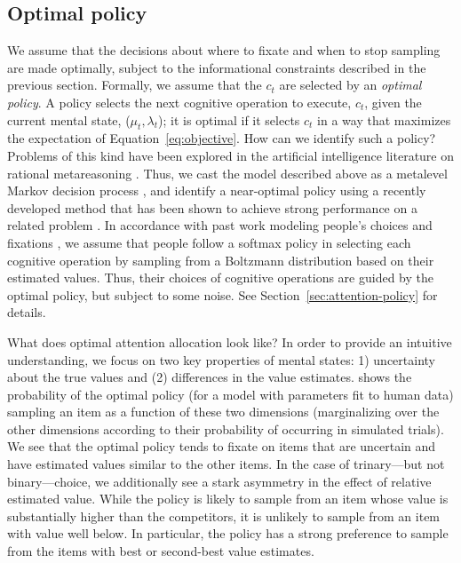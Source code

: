\subsection{Optimal policy}

We assume that the decisions about where to fixate and when to stop sampling are made optimally, subject to the informational constraints described in the previous section. Formally, we assume that the $c_t$ are selected by an \emph{optimal policy}. A policy selects the next cognitive operation to execute, $c_t$, given the current mental state, ($\mu_t, \lambda_t$); it is optimal if it selects $c_t$ in a way that maximizes the expectation of Equation~\ref{eq:objective}. How can we identify such a policy? Problems of this kind have been explored in the artificial intelligence literature on rational metareasoning \citep{matheson1968economic,russell1991principles}. Thus, we cast the model described above as a metalevel Markov decision process \citep{hay2012selecting}, and identify a near-optimal policy using a recently developed method that has been shown to achieve strong performance on a related problem \citep{callaway2018learning}. In accordance with past work modeling people's choices \citep{mcfadden2001economic} and fixations \citep{gluth2020valuebased,song2019proactive}, we assume that people follow a softmax policy in selecting each cognitive operation by sampling from a Boltzmann distribution based on their estimated values. Thus, their choices of cognitive operations are guided by the optimal policy, but subject to some noise. See Section~\ref{sec:attention-policy} for details.

What does optimal attention allocation look like? In order to provide an intuitive understanding, we focus on two key properties of mental states: 1) uncertainty about the true values and (2) differences in the value estimates.  shows the probability of the optimal policy (for a model with parameters fit to human data) sampling an item as a function of these two dimensions (marginalizing over the other dimensions according to their probability of occurring in simulated trials).
We see that the optimal policy tends to fixate on items that are uncertain and have estimated values similar to the other items.
In the case of trinary---but not binary---choice, we additionally see a stark asymmetry in the effect of relative estimated value. While the policy is likely to sample from an item whose value is substantially higher than the competitors, it is unlikely to sample from an item with value well below. In particular, the policy has a strong preference to sample from the items with best or second-best value estimates.


